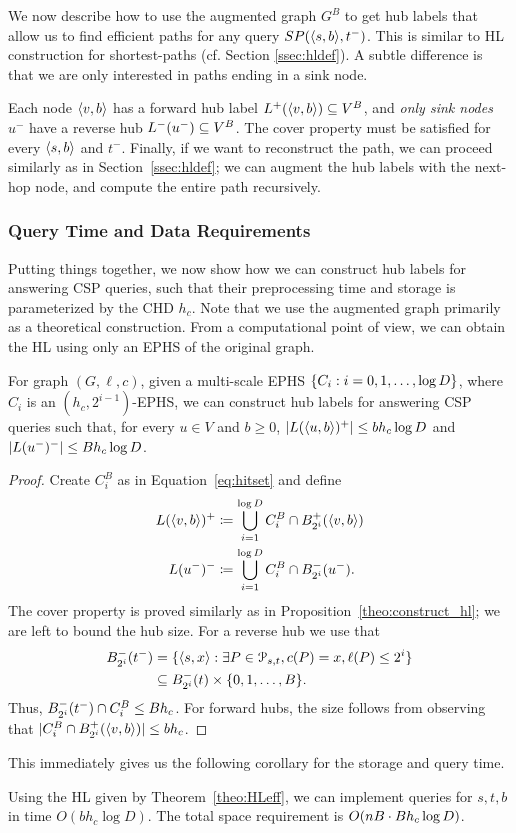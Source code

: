 We now describe how to use the augmented graph $G^B$ to get hub labels that allow us to find efficient paths for any query $SP(\pp{s,b},t^-)$.
This is similar to HL construction for shortest-paths (cf. Section \ref{ssec:hldef}).
A subtle difference is that we are only interested in paths ending in a sink node.

Each node $\pp{v,b}$ has a forward hub label $\Lf(\pp{v,b})\subseteq V^B$, and \emph{only sink nodes} $u^-$ have a reverse hub $\Lb(u^-)\subseteq V^B$.
The cover property must be satisfied for every $\pp{s,b}$ and $t^-$.
Finally, if we want to reconstruct the path, we can proceed similarly as in Section~\ref{ssec:hldef}; we can augment the hub labels with the next-hop node, and compute the entire path recursively.

\subsubsection{Query Time and Data Requirements}
Putting things together, we now show how we can construct hub labels for answering CSP queries, such that their preprocessing time and storage is parameterized by the CHD $h_c$.
Note that we use the augmented graph primarily as a theoretical construction.
From a computational point of view, we can obtain the HL using only an EPHS of the original graph.

\begin{theorem}
\label{theo:HLeff}
For graph $(G,\ell,c)$, given a multi-scale EPHS $\crl*{C_i:i=0,1,\ldots,\log D}$, where $C_i$ is an $(h_c,2^{i-1})$-EPHS, we can construct hub labels for answering CSP queries such that, for every $u\in V$ and $b\geq 0$, $\card{L(\pp{u,b})^+}\leq bh_c\log D$ and $\card{L(u^-)^-}\leq Bh_c\log D$. 
\end{theorem}
\begin{proof}
Create $C_i^B$ as in Equation~\eqref{eq:hitset} and define
\begin{align*}
L(\pp{v,b})^+ &\defeq \bigcup_{i=1}^{\log D} C_i^B\cap \Bf_{2^i}(\pp{v,b})\\
L(u^-)^-  &\defeq \bigcup_{i=1}^{\log D} C_i^B\cap \Bb_{2^i}(u^-).
\end{align*}
The cover property is proved similarly as in Proposition~\ref{theo:construct_hl}; we are left to bound the hub size.
For a reverse hub we use that
\begin{align*}
\Bb_{2^i}(t^-) &= \{\pp{s,x}: \exists P\in \Pst, c(P)=x, \ell(P)\leq 2^i\}\\
&\subseteq \Bb_{2^i}(t)\times \{0,1,\ldots,B\}.
\end{align*}
Thus, $\Bb_{2^i}(t^-)\cap C_i^B\leq Bh_c$.
For forward hubs, the size follows from observing that $ \card{C_i^B\cap \Bf_{2^i}(\pp{v,b})}\leq bh_c$.
\end{proof}

This immediately gives us the following corollary for the storage and query time.
\begin{corollary}
Using the HL given by Theorem~\ref{theo:HLeff}, we can implement queries for $s,t,b$ in time $O(b h_c\log D)$.
The total space requirement is $\Or(nB \cdot Bh_c\log D)$.
\end{corollary}